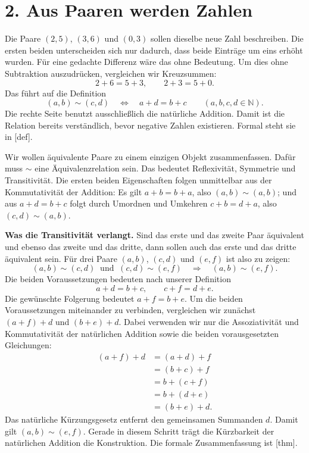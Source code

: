 \par{}
\hypertarget{integers.reading.classes}{}
\section*{2. Aus Paaren werden Zahlen}

Die Paare \((2,5)\), \((3,6)\) und \((0,3)\) sollen dieselbe
neue Zahl beschreiben. Die ersten beiden unterscheiden sich nur dadurch,
dass beide Einträge um eins erhöht wurden. Für eine gedachte Differenz
wäre das ohne Bedeutung. Um dies ohne Subtraktion auszudrücken,
vergleichen wir Kreuzsummen:
\[
  2+6=5+3,
  \qquad
  2+3=5+0.
\]
Das führt auf die Definition
\[
  (a,b)\sim(c,d)
  \quad\Longleftrightarrow\quad
  a+d=b+c
  \qquad(a,b,c,d\in\mathbb N).
\]
Die rechte Seite benutzt ausschließlich die natürliche Addition. Damit
ist die Relation bereits verständlich, bevor negative Zahlen existieren.
Formal steht sie in [def].

Wir wollen äquivalente Paare zu einem einzigen Objekt zusammenfassen.
Dafür muss \(\sim\) eine Äquivalenzrelation sein. Das bedeutet
Reflexivität, Symmetrie und Transitivität. Die ersten beiden Eigenschaften
folgen unmittelbar aus der Kommutativität der Addition: Es gilt
\(a+b=b+a\), also \((a,b)\sim(a,b)\); und aus
\(a+d=b+c\) folgt durch Umordnen und Umkehren
\(c+b=d+a\), also \((c,d)\sim(a,b)\).

\medskip\noindent\textbf{Was die Transitivität verlangt.}
Sind das erste und das zweite Paar äquivalent und ebenso das zweite
und das dritte, dann sollen auch das erste und das dritte äquivalent
sein. Für drei Paare \((a,b)\), \((c,d)\) und \((e,f)\) ist also
zu zeigen:
\[
  (a,b)\sim(c,d)\ \text{ und }\ (c,d)\sim(e,f)
  \quad\Longrightarrow\quad (a,b)\sim(e,f).
\]
Die beiden Voraussetzungen bedeuten nach unserer Definition
\[
  a+d=b+c,
  \qquad c+f=d+e.
\]
Die gewünschte Folgerung bedeutet \(a+f=b+e\). Um die beiden
Voraussetzungen miteinander zu verbinden, vergleichen wir zunächst
\((a+f)+d\) und \((b+e)+d\). Dabei verwenden wir nur die
Assoziativität und Kommutativität der natürlichen Addition sowie
die beiden vorausgesetzten Gleichungen:
\[
  \begin{aligned}
    (a+f)+d
      &=(a+d)+f\\
      &=(b+c)+f\\
      &=b+(c+f)\\
      &=b+(d+e)\\
      &=(b+e)+d.
  \end{aligned}
\]
Das natürliche Kürzungsgesetz entfernt den gemeinsamen Summanden \(d\).
Damit gilt \((a,b)\sim(e,f)\). Gerade in diesem Schritt trägt die
Kürzbarkeit der natürlichen Addition die Konstruktion. Die formale
Zusammenfassung ist [thm].


